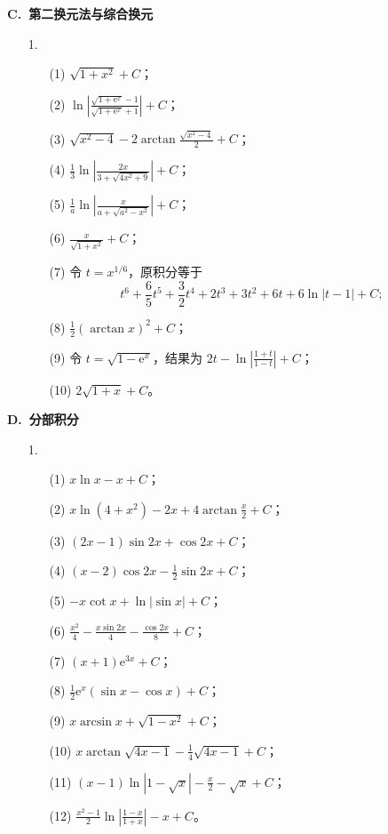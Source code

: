 \documentclass[fontset=fandol]{ctexart}
\newcommand{\ee}{\mathrm{e}}
\begin{document}
\textbf{C.\ 第二换元法与综合换元}

\begin{enumerate}
\item[1.]
\begin{enumerate}
\item[(1)] $\sqrt{1+x^2}+C$；
\item[(2)] $\displaystyle \ln\left|\frac{\sqrt{1+\ee^x}-1}{\sqrt{1+\ee^x}+1}\right|+C$；
\item[(3)] $\displaystyle \sqrt{x^2-4}-2\arctan\frac{\sqrt{x^2-4}}{2}+C$；
\item[(4)] $\displaystyle \frac13\ln\left|\frac{2x}{3+\sqrt{4x^2+9}}\right|+C$；
\item[(5)] $\displaystyle \frac1a\ln\left|\frac{x}{a+\sqrt{a^2-x^2}}\right|+C$；
\item[(6)] $\displaystyle \frac{x}{\sqrt{1+x^2}}+C$；
\item[(7)] 令 $t=x^{1/6}$，原积分等于
\[
t^6+\frac65t^5+\frac32t^4+2t^3+3t^2+6t+6\ln|t-1|+C;
\]
\item[(8)] $\displaystyle \frac12(\arctan x)^2+C$；
\item[(9)] 令 $t=\sqrt{1-\ee^x}$，结果为 $\displaystyle 2t-\ln\left|\frac{1+t}{1-t}\right|+C$；
\item[(10)] $2\sqrt{1+x}+C$。
\end{enumerate}
\end{enumerate}

\textbf{D.\ 分部积分}

\begin{enumerate}
\item[1.]
\begin{enumerate}
\item[(1)] $x\ln x-x+C$；
\item[(2)] $\displaystyle x\ln(4+x^2)-2x+4\arctan\frac{x}{2}+C$；
\item[(3)] $\displaystyle (2x-1)\sin2x+\cos2x+C$；
\item[(4)] $\displaystyle (x-2)\cos2x-\frac12\sin2x+C$；
\item[(5)] $\displaystyle -x\cot x+\ln|\sin x|+C$；
\item[(6)] $\displaystyle \frac{x^2}{4}-\frac{x\sin2x}{4}-\frac{\cos2x}{8}+C$；
\item[(7)] $(x+1)\ee^{3x}+C$；
\item[(8)] $\displaystyle \frac12\ee^x(\sin x-\cos x)+C$；
\item[(9)] $\displaystyle x\arcsin x+\sqrt{1-x^2}+C$；
\item[(10)] $\displaystyle x\arctan\sqrt{4x-1}-\frac14\sqrt{4x-1}+C$；
\item[(11)] $\displaystyle (x-1)\ln|1-\sqrt{x}|-\frac{x}{2}-\sqrt{x}+C$；
\item[(12)] $\displaystyle \frac{x^2-1}{2}\ln\left|\frac{1-x}{1+x}\right|-x+C$。
\end{enumerate}
\end{enumerate}
\end{document}
